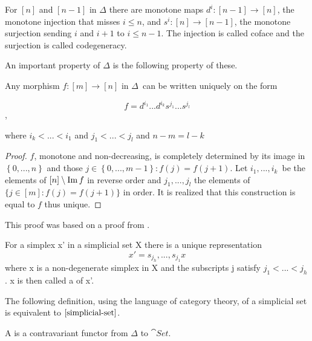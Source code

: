 \documentclass[../../main.tex]{subfiles}
\begin{document}
    For $[n]$ and $[n-1]$ in $\Delta$ there are monotone maps $d^i: [n-1] \to [n]$, the monotone injection that misses $i \leq n$, and $s^i: [n] \to [n-1]$, the monotone surjection sending $i$ and $i+1$ to $i \leq n-1$. The injection is called coface and the surjection is called codegeneracy. 


    An important property of $\Delta$ is the following property of these.

    \begin{proposition}\label{uni-fun}
        Any morphism $f: [m] \to [n]$ in $\Delta$ can be written uniquely on the form

        \begin{equation*}
            f = d^{i_1}...d^{i_k}s^{j_1}...s^{j_l}
        \end{equation*},

        where $i_k < ... < i_1$ and $j_1 < ... < j_l$ and $n - m = l - k$
    \end{proposition}

    \begin{proof}
        $f$, monotone and non-decreasing, is completely determined by its image in $\left\{ 0,...,n \right\}$ and those $j\in \left\{0,...,m-1 \right\}:f(j) = f(j+1)$. Let $i_1, ..., i_k$ be the elements of $[n] \setminus \operatorname{Im} f$ in reverse order and $j_1, ..., j_l$ the elements of $\{j \in [m]: f(j) = f(j+1)\}$ in order. It is realized that this construction is equal to $f$ thus unique.
    \end{proof}

    This proof was based on a proof from \cite{simp-maye}.

    \begin{corollary}\label{uni-sim}
        For a simplex x' in a simplicial set X there is a unique representation
        \[x' = s_{j_h},...,s_{j_1}x\]
        where x is a non-degenerate simplex in X and the subscripts j satisfy $j_1 <... < j_h$. x is then called a  of x'.
    \end{corollary}

    The following definition, using the language of category theory, of a simplicial set is equivalent to $\ref{simplicial-set}$.

    \begin{definition}
        A  is a contravariant functor from $\Delta$ to $\cat{Set}$.
    \end{definition}
\end{document}
